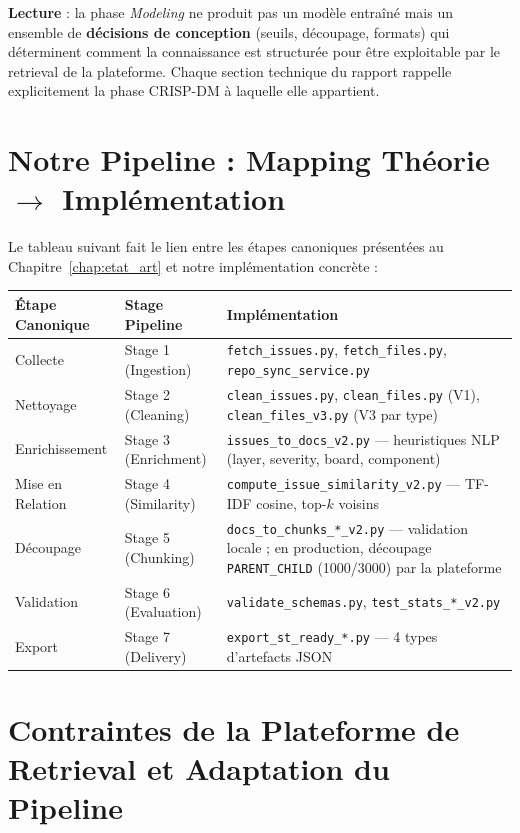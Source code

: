\documentclass[12pt,a4paper]{report}
\begin{document}
\textbf{Lecture} : la phase \textit{Modeling} ne produit pas un modèle entraîné mais un ensemble de \textbf{décisions de conception} (seuils, découpage, formats) qui déterminent comment la connaissance est structurée pour être exploitable par le retrieval de la plateforme. Chaque section technique du rapport rappelle explicitement la phase CRISP-DM à laquelle elle appartient.

\section{Notre Pipeline : Mapping Théorie $\to$ Implémentation}
\label{sec:pipeline_mapping}

Le tableau suivant fait le lien entre les étapes canoniques présentées au Chapitre~\ref{chap:etat_art} et notre implémentation concrète :

\begin{longtable}{p{3.5cm}p{3.5cm}p{6cm}}
\toprule
\textbf{Étape Canonique} & \textbf{Stage Pipeline} & \textbf{Implémentation} \\
\midrule
Collecte & Stage 1 (Ingestion) & \texttt{fetch\_issues.py}, \texttt{fetch\_files.py}, \texttt{repo\_sync\_service.py} \\
Nettoyage & Stage 2 (Cleaning) & \texttt{clean\_issues.py}, \texttt{clean\_files.py} (V1), \texttt{clean\_files\_v3.py} (V3 par type) \\
Enrichissement & Stage 3 (Enrichment) & \texttt{issues\_to\_docs\_v2.py} --- heuristiques NLP (layer, severity, board, component) \\
Mise en Relation & Stage 4 (Similarity) & \texttt{compute\_issue\_similarity\_v2.py} --- TF-IDF cosine, top-$k$ voisins \\
Découpage & Stage 5 (Chunking) & \texttt{docs\_to\_chunks\_*\_v2.py} --- validation locale ; en production, découpage \texttt{PARENT\_CHILD} (1000/3000) par la plateforme \\
Validation & Stage 6 (Evaluation) & \texttt{validate\_schemas.py}, \texttt{test\_stats\_*\_v2.py} \\
Export & Stage 7 (Delivery) & \texttt{export\_st\_ready\_*.py} --- 4 types d'artefacts JSON \\
\bottomrule
\end{longtable}

\section{Contraintes de la Plateforme de Retrieval et Adaptation du Pipeline}
\label{sec:contraintes_plateforme}
\end{document}
